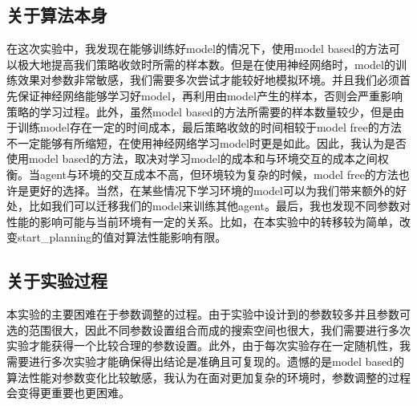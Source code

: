 \documentclass[a4paper,12pt]{article}
\begin{document}
\begin{CJK}{UTF8}{gbsn}
\subsection{关于算法本身}
在这次实验中，我发现在能够训练好model的情况下，使用model based的方法可以极大地提高我们策略收敛时所需的样本数。但是在使用神经网络时，model的训练效果对参数非常敏感，我们需要多次尝试才能较好地模拟环境。并且我们必须首先保证神经网络能够学习好model，再利用由model产生的样本，否则会严重影响策略的学习过程。此外，虽然model based的方法所需要的样本数量较少，但是由于训练model存在一定的时间成本，最后策略收敛的时间相较于model free的方法不一定能够有所缩短，在使用神经网络学习model时更是如此。因此，我认为是否使用model based的方法，取决对学习model的成本和与环境交互的成本之间权衡。当agent与环境的交互成本不高，但环境较为复杂的时候，model free的方法也许是更好的选择。当然，在某些情况下学习环境的model可以为我们带来额外的好处，比如我们可以迁移我们的model来训练其他agent。最后，我也发现不同参数对性能的影响可能与当前环境有一定的关系。比如，在本实验中的转移较为简单，改变start\_planning的值对算法性能影响有限。
\subsection{关于实验过程}
本实验的主要困难在于参数调整的过程。由于实验中设计到的参数较多并且参数可选的范围很大，因此不同参数设置组合而成的搜索空间也很大，我们需要进行多次实验才能获得一个比较合理的参数设置。此外，由于每次实验存在一定随机性，我需要进行多次实验才能确保得出结论是准确且可复现的。遗憾的是model based的算法性能对参数变化比较敏感，我认为在面对更加复杂的环境时，参数调整的过程会变得更重要也更困难。

\end{CJK}
\end{document}
